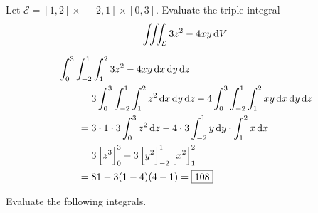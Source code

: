 \documentclass[12pt,answers]{exam}
\begin{document}
\begin{questions}
	\newpage
	\question[10] Let $\mathcal E = [1,2] \times [-2, 1] \times [0,3]$.
	Evaluate the triple integral
	\[
		\iiint_{\mathcal E} 3z^2 - 4xy \dif V
	\]
	\begin{solution}
		\begin{align*}
			\MoveEqLeft \int_0^3 \int_{-2}^1 \int_1^2 3z^2 - 4xy \dif x \dif y \dif z \\
			&= 3\int_0^3 \int_{-2}^1 \int_1^2 z^2 \dif x \dif y \dif z
			-4 \int_0^3 \int_{-2}^1 \int_1^2 xy \dif x \dif y \dif z \\
			&= 3 \cdot 1 \cdot 3 \int_0^3 z^2 \dif z
			-4 \cdot 3  \int_{-2}^1 y \dif y \cdot \int_1^2 x \dif x  \\
			&= 3 \left[ z^3 \right]_0^3 - 3 \left[ y^2 \right]_{-2}^1 \left[ x^2 \right]_1^2 \\
			&= 81 - 3(1-4)(4-1) = \boxed{108}
		\end{align*}
	\end{solution}

	\newpage
	\question
	Evaluate the following integrals.


\end{questions}
\end{document}
